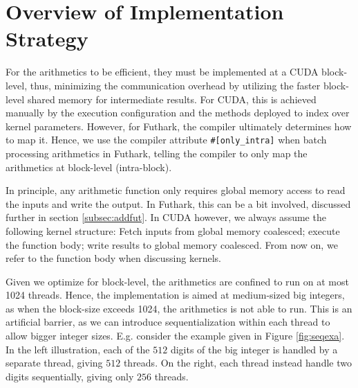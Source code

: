 \section{Overview of Implementation Strategy}
\label{sec:strat}

For the arithmetics to be efficient, they must be implemented at a CUDA
block-level, thus, minimizing the communication overhead by utilizing the faster
block-level shared memory for intermediate results. For CUDA, this is achieved
manually by the execution configuration and the methods deployed to index over
kernel parameters. However, for Futhark, the compiler ultimately determines how
to map it. Hence, we use the compiler attribute \texttt{\#[only\_intra]} when
batch processing arithmetics in Futhark, telling the compiler to only map the
arithmetics at block-level (intra-block).

In principle, any arithmetic function only requires global memory access to read
the inputs and write the output. In Futhark, this can be a bit involved,
discussed further in section \ref{subsec:addfut}. In CUDA however, we always
assume the following kernel structure: Fetch inputs from global memory
coalesced; execute the function body; write results to global memory
coalesced. From now on, we refer to the function body when discussing kernels.

Given we optimize for block-level, the arithmetics are confined to run on at
most 1024 threads.  Hence, the implementation is aimed at medium-sized big
integers, as when the block-size exceeds 1024, the arithmetics is not able to
run. This is an artificial barrier, as we can introduce sequentialization within
each thread to allow bigger integer sizes. E.g. consider the example given in
Figure \ref{fig:seqexa}. In the left illustration, each of the $512$ digits of
the big integer is handled by a separate thread, giving $512$ threads. On the
right, each thread instead handle two digits sequentially, giving only $256$
threads.

